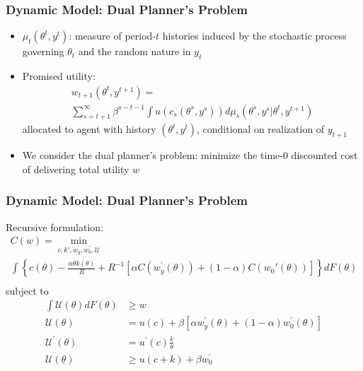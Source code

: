 \documentclass{beamer}
\begin{document}
\begin{frame}
    \frametitle{Dynamic Model: Dual Planner's Problem}

    \begin{itemize}
        \item \( \mu_t\left( \theta^t, y^t \right) \): measure of period-\( t \) histories induced by the stochastic process governing \( \theta_t \) and the random nature in \( y_t \)
        \item Promised utility:
        \begin{multline*}
            w_{t+1}\left(\theta^{t},y^{t+1}\right)=\\
            \sum_{s=t+1}^{\infty}\beta^{s-t-1}\int u\left(c_{s}\left(\theta^{s},y^{s}\right)\right)d\mu_{s}\left(\theta^{s},y^{s}|\theta^{t},y^{t+1}\right)
        \end{multline*}
        allocated to agent with history \( \left( \theta^t,y^t \right) \), conditional on realization of \( y_{t+1} \)
        \item  We consider the dual planner's problem: minimize the time-0 discounted cost of delivering total utility \( w \)
    \end{itemize}

\end{frame}

\begin{frame}
    \frametitle{Dynamic Model: Dual Planner's Problem} %

    Recursive formulation:
    \begin{multline}
        C\left(w\right)= \min_{c,k',w_{y}^{\prime},w_{0}^{\prime},\mathcal{U}} \\
        \int\left\{ c\left(\theta\right)-\frac{\alpha\theta k\left(\theta\right)}{R}+R^{-1}\left[\alpha C\left(w_{y}^{\prime}\left(\theta\right)\right)+\left(1-\alpha\right)C\left(w_{0}'\left(\theta\right)\right)\right]\right\} dF\left(\theta\right) \\ \label{eqn:plan_rec}
    \end{multline}
    subject to 
    \begin{align*}
        \int\mathcal{U}\left(\theta\right)dF\left(\theta\right) &\ge w \\
        \mathcal{U}\left(\theta\right) &= u\left(c\right)+\beta\left[\alpha w_{y}^{\prime}\left(\theta\right)+\left(1-\alpha\right)w_{0}^{\prime}\left(\theta\right)\right]  \\
        \mathcal{U}^{\prime}\left(\theta\right) &= u^{\prime}\left(c\right)\frac{k}{\theta}  \\
        \mathcal{U}\left(\underline{\theta}\right) &\ge u\left(c+k\right)+\beta w_{0}^{\prime} 
    \end{align*}
    

\end{frame}
\end{document}

